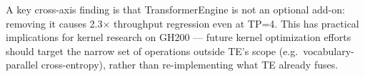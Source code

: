 \documentclass[10pt,twocolumn,letterpaper]{article}
\begin{document}
A key cross-axis finding is that TransformerEngine is not an optional add-on: removing it causes 2.3$\times$ throughput regression even at TP=4. This has practical implications for kernel research on GH200 — future kernel optimization efforts should target the narrow set of operations outside TE's scope (e.g.\ vocabulary-parallel cross-entropy), rather than re-implementing what TE already fuses.

\cleardoublepage
{
    \small
    
    
}
\end{document}
